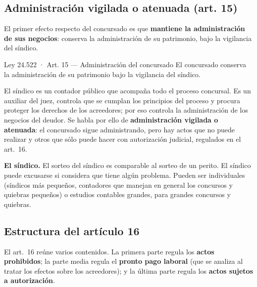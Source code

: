 \documentclass[12pt,oneside]{book}
\begin{document}
\subsection{Administración vigilada o atenuada (art. 15)}

El primer efecto respecto del concursado es que \textbf{mantiene la administración de sus negocios}: conserva la administración de su patrimonio, bajo la vigilancia del síndico.

\begin{norma}{Ley 24.522 · Art. 15 — Administración del concursado}
El concursado conserva la administración de su patrimonio bajo la vigilancia del síndico.
\end{norma}

El síndico es un contador público que acompaña todo el proceso concursal. Es un auxiliar del juez, controla que se cumplan los principios del proceso y procura proteger los derechos de los acreedores; por eso controla la administración de los negocios del deudor. Se habla por ello de \textbf{administración vigilada o atenuada}: el concursado sigue administrando, pero hay actos que no puede realizar y otros que sólo puede hacer con autorización judicial, regulados en el art.~16.

\textbf{El síndico.} El sorteo del síndico es comparable al sorteo de un perito. El síndico puede excusarse si considera que tiene algún problema. Pueden ser individuales (síndicos más pequeños, contadores que manejan en general los concursos y quiebras pequeños) o estudios contables grandes, para grandes concursos y quiebras.

\subsection{Estructura del artículo 16}

El art.~16 reúne varios contenidos. La primera parte regula los \textbf{actos prohibidos}; la parte media regula el \textbf{pronto pago laboral} (que se analiza al tratar los efectos sobre los acreedores); y la última parte regula los \textbf{actos sujetos a autorización}.
\end{document}

